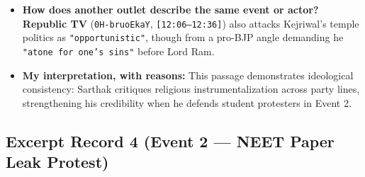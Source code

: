 \documentclass[10pt,a4paper]{article}
\begin{document}
\begin{itemize}[leftmargin=1.5em, itemsep=3pt, topsep=4pt]
  \item \textbf{How does another outlet describe the same event or actor?} \textbf{Republic TV} (\texttt{0H-bruoEkaY}, \texttt{[12:06--12:36]}) also attacks Kejriwal's temple politics as \texttt{"opportunistic"}, though from a pro-BJP angle demanding he \texttt{"atone for one's sins"} before Lord Ram.
  \item \textbf{My interpretation, with reasons:} This passage demonstrates ideological consistency: Sarthak critiques religious instrumentalization across party lines, strengthening his credibility when he defends student protesters in Event 2.
\end{itemize}

\subsection*{Excerpt Record 4 (Event 2 --- NEET Paper Leak Protest)}
\end{document}
